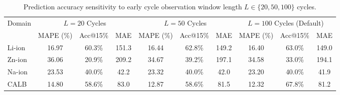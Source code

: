 \begin{table}[htbp]
\centering
\caption{Prediction accuracy sensitivity to early cycle observation window length $L \in \{20, 50, 100\}$ cycles.}
\label{tab:early_window_sensitivity}
\begin{tabular}{l ccc ccc ccc}
\toprule
Domain & \multicolumn{3}{c}{$L=20$ Cycles} & \multicolumn{3}{c}{$L=50$ Cycles} & \multicolumn{3}{c}{$L=100$ Cycles (Default)} \\
\cmidrule(lr){2-4} \cmidrule(lr){5-7} \cmidrule(lr){8-10}
 & MAPE (\%) & Acc@15\% & MAE & MAPE (\%) & Acc@15\% & MAE & MAPE (\%) & Acc@15\% & MAE \\
\midrule
Li-ion & 16.97 & 60.3\% & 151.3 & 16.44 & 62.8\% & 149.2 & 16.40 & 63.0\% & 149.0 \\
Zn-ion & 36.06 & 20.9\% & 209.2 & 34.67 & 39.2\% & 197.1 & 34.58 & 33.0\% & 194.1 \\
Na-ion & 23.53 & 40.0\% & 42.2 & 23.32 & 40.0\% & 42.0 & 23.20 & 40.0\% & 41.9 \\
CALB & 14.80 & 58.6\% & 83.0 & 12.87 & 58.6\% & 81.5 & 12.32 & 67.8\% & 81.2 \\
\bottomrule
\end{tabular}
\end{table}
